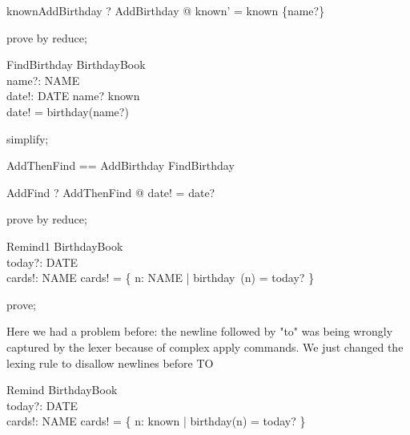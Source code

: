 \begin{theorem}{knownAddBirthday}
\vdash? \forall AddBirthday @ known' = known \cup  \{name?\}
\end{theorem}

\begin{zproof}[knownAddBirthday]
prove by reduce;
\end{zproof}

\begin{schema}{FindBirthday}
  \Xi BirthdayBook\\
  name?: NAME\\
  date!: DATE
\where
  name? \in  known\\
  date! = birthday(name?)
\end{schema}

\begin{zproof}
simplify;
\end{zproof}

\begin{zed}
AddThenFind == AddBirthday \semi  FindBirthday
\end{zed}

\begin{theorem}{AddFind}
\vdash? \forall AddThenFind @ date! = date?
\end{theorem}

\begin{zproof}[AddFind]
prove by reduce;
\end{zproof}

\begin{schema}{Remind1}
  \Xi BirthdayBook\\
  today?: DATE\\
  cards!: \power  NAME
\where
  cards! = \{  n: NAME | birthday~(n) = today? \}
\end{schema}

\begin{zproof}
prove;
\end{zproof}

Here we had a problem before: the newline followed by "to" was being wrongly
captured by the lexer because of complex apply commands. We just changed the
lexing rule to disallow newlines before TO
\begin{schema}{Remind}
  \Xi BirthdayBook \\
  today?: DATE\\
  cards!: \power  NAME
\where
  cards! = \{  n: known | birthday(n) = today? \}
\end{schema}

